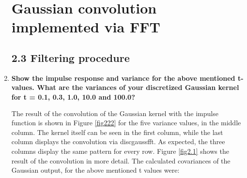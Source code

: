 \documentclass{article}
\begin{document}
\begin{enumerate}
\section{Gaussian convolution implemented via FFT}

\subsection{2.3 Filtering procedure}
\item \textbf{Show the impulse response and variance for the above mentioned t-values. What are the variances of your discretized Gaussian kernel for t = 0.1, 0.3, 1.0, 10.0 and 100.0?}




The result of the convolution of the Gaussian kernel with the impulse function is shown in Figure \ref{fig222} for the five variance values, in the middle column. The kernel itself can be seen in the first column, while the last column displays the convolution via discgaussfft. As expected, the three columns display the same pattern for every row. Figure \ref{fig2.1} shows the result of the convolution in more detail. The calculated covariances of the Gaussian output, for the above mentioned t values were:


\end{enumerate}
\end{document}

